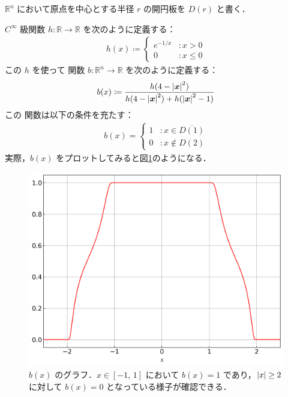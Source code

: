 \documentclass[geometry_main]{subfiles}
\begin{document}
$\mathbb{R}^n$ において原点を中心とする半径 $r$ の開円板を $D(r)$ と書く．

$C^\infty$ 級関数 $h \colon \mathbb{R} \to \mathbb{R}$ を次のように定義する：
\begin{align}
	h(x) \coloneqq
	\begin{cases}
		e^{-1/x} & \colon x > 0 \\
		0 & \colon x \le 0
	\end{cases}
\end{align}
この $h$ を使って \cinfty 関数 $b \colon \mathbb{R}^n \to \mathbb{R}$ を次のように定義する：
\begin{align}
	b(x) \coloneqq \frac{h(4 - \abs{\vb*{x}}^2)}{h(4 - \abs{\vb*{x}}^2) + h(\abs{\vb*{x}}^2 - 1)}
\end{align}
この \cinfty 関数は以下の条件を充たす：
\begin{align}
	b(x) = \label{eq:apD-bump}
	\begin{cases}
		1 & \colon x \in \overline{D(1)} \\
		0 & \colon x \notin D(2)
	\end{cases}
\end{align}
実際，$b(x)$ をプロットしてみると図\ref{fig:apD-bump}のようになる．

\begin{figure}[H]
    \centering
    \includegraphics[scale=0.45]{./figs/fig-apD_bump.png}
    \caption{$b(x)$ のグラフ．$x \in [-1,\, 1]$ において $b(x) = 1$ であり，$\abs{x} \ge 2$ に対して $b(x) = 0$ となっている様子が確認できる．}
    \label{fig:apD-bump}
\end{figure}%
\end{document}

